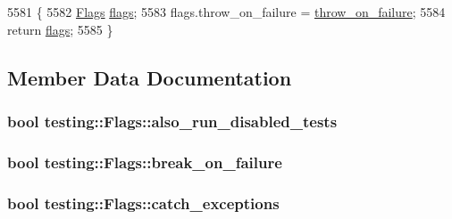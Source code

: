 \begin{DoxyCode}
5581                                                      \{
5582     \hyperlink{structtesting_1_1Flags_a41dc8942bec08ebc7f74dee545e6ad7e}{Flags} \hyperlink{_8ycm__extra__conf_8py_abd73d8e4551f1a637280b3876d1ae2e3}{flags};
5583     flags.throw\_on\_failure = \hyperlink{structtesting_1_1Flags_ab8e7d21e31e641efe47b8050759e001a}{throw\_on\_failure};
5584     \textcolor{keywordflow}{return} \hyperlink{_8ycm__extra__conf_8py_abd73d8e4551f1a637280b3876d1ae2e3}{flags};
5585   \}
\end{DoxyCode}


\subsection{Member Data Documentation}
\subsubsection[{\texorpdfstring{also\+\_\+run\+\_\+disabled\+\_\+tests}{also_run_disabled_tests}}]{\setlength{\rightskip}{0pt plus 5cm}bool testing\+::\+Flags\+::also\+\_\+run\+\_\+disabled\+\_\+tests}\hypertarget{structtesting_1_1Flags_a8ebf8c68f918b9039926b569c880f910}{}\label{structtesting_1_1Flags_a8ebf8c68f918b9039926b569c880f910}
\subsubsection[{\texorpdfstring{break\+\_\+on\+\_\+failure}{break_on_failure}}]{\setlength{\rightskip}{0pt plus 5cm}bool testing\+::\+Flags\+::break\+\_\+on\+\_\+failure}\hypertarget{structtesting_1_1Flags_acccce2a9673bb61751269d2ef9c21c89}{}\label{structtesting_1_1Flags_acccce2a9673bb61751269d2ef9c21c89}
\subsubsection[{\texorpdfstring{catch\+\_\+exceptions}{catch_exceptions}}]{\setlength{\rightskip}{0pt plus 5cm}bool testing\+::\+Flags\+::catch\+\_\+exceptions}\hypertarget{structtesting_1_1Flags_a06984d0553f09716e1bd9f159e7cc644}{}\label{structtesting_1_1Flags_a06984d0553f09716e1bd9f159e7cc644}
